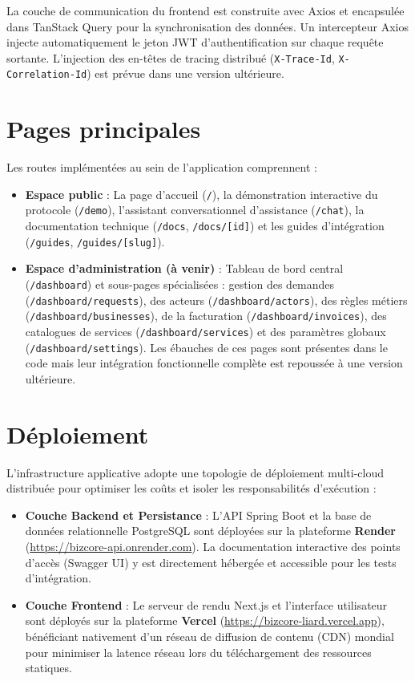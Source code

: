La couche de communication du frontend est construite avec Axios et encapsulée dans TanStack Query pour la synchronisation des données. Un intercepteur Axios injecte automatiquement le jeton JWT d'authentification sur chaque requête sortante. L'injection des en-têtes de tracing distribué (\texttt{X-Trace-Id}, \texttt{X-Correlation-Id}) est prévue dans une version ultérieure.

\section{Pages principales}

Les routes implémentées au sein de l'application comprennent :
\begin{itemize}
    \item \textbf{Espace public} : La page d'accueil (\texttt{/}), la démonstration interactive du protocole (\texttt{/demo}), l'assistant conversationnel d'assistance (\texttt{/chat}), la documentation technique (\texttt{/docs}, \texttt{/docs/[id]}) et les guides d'intégration (\texttt{/guides}, \texttt{/guides/[slug]}).
    \item \textbf{Espace d'administration (à venir)} : Tableau de bord central (\texttt{/dashboard}) et sous-pages spécialisées : gestion des demandes (\texttt{/dashboard/requests}), des acteurs (\texttt{/dashboard/actors}), des règles métiers (\texttt{/dashboard/businesses}), de la facturation (\texttt{/dashboard/invoices}), des catalogues de services (\texttt{/dashboard/services}) et des paramètres globaux (\texttt{/dashboard/settings}). Les ébauches de ces pages sont présentes dans le code mais leur intégration fonctionnelle complète est repoussée à une version ultérieure.
\end{itemize}

\section{Déploiement}

L'infrastructure applicative adopte une topologie de déploiement multi-cloud distribuée pour optimiser les coûts et isoler les responsabilités d'exécution :
\begin{itemize}
    \item \textbf{Couche Backend et Persistance} : L'API Spring Boot et la base de données relationnelle PostgreSQL sont déployées sur la plateforme \textbf{Render} (\url{https://bizcore-api.onrender.com}). La documentation interactive des points d'accès (Swagger UI) y est directement hébergée et accessible pour les tests d'intégration.
    \item \textbf{Couche Frontend} : Le serveur de rendu Next.js et l'interface utilisateur sont déployés sur la plateforme \textbf{Vercel} (\url{https://bizcore-liard.vercel.app}), bénéficiant nativement d'un réseau de diffusion de contenu (CDN) mondial pour minimiser la latence réseau lors du téléchargement des ressources statiques.
\end{itemize}

